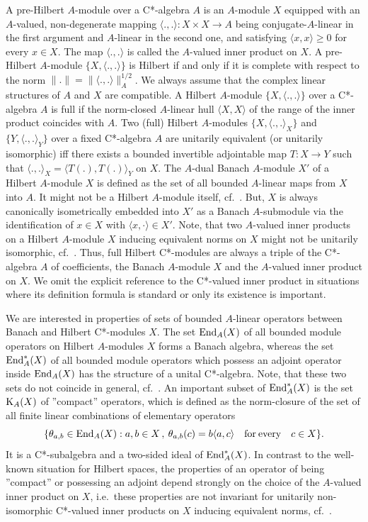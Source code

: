 \documentclass{amsart}
\theoremstyle{definition}
\begin{document}
A pre-Hilbert $A$-module over a C*-algebra $A$ is an $A$-module $X$ equipped with an $A$-valued, non-degenerate mapping $ \langle .,.
\rangle : X \times X \to A$ being conjugate-$A$-linear in the first argument and $A$-linear in the second one, and satisfying $\langle x,x \rangle \geq 0$ for every $x \in X$. The map $\langle .,. \rangle$ is called the $A$-valued inner product on $X$. A pre-Hilbert $A$-module $\{ X, \langle .,. \rangle \}$ is Hilbert if and only if it is complete with respect to the norm $\| . \| = \| \langle .,. \rangle \|^{1/2}_A$. We always assume that the complex linear structures of
$A$ and $X$ are compatible. A Hilbert $A$-module $\{ X, \langle .,. \rangle \}$ over a C*-algebra $A$ is full if the norm-closed $A$-linear hull $\langle X,X \rangle$ of the range of the inner product coincides with $A$. Two (full) Hilbert $A$-modules $\{ X , \langle .,. \rangle_X \}$ and $\{ Y, \langle .,. \rangle_Y \}$ over a fixed C*-algebra $A$ are unitarily equivalent (or unitarily isomorphic) iff there exists a bounded invertible adjointable map $T: X \to Y$ such that $\langle .,. \rangle_X = \langle T(.),T(.) \rangle_Y$ on $X$. The $A$-dual Banach $A$-module $X'$ of a Hilbert $A$-module $X$ is defined as the set of all bounded $A$-linear maps from $X$ into $A$. It might not be a Hilbert $A$-module itself, cf.~\cite{F_1999_1}. But, $X$ is always canonically isometrically embedded into $X'$ as a Banach $A$-submodule via the identification of $x \in X$ with $\langle x, \cdot \rangle \in X'$. 
Note, that two $A$-valued inner products on a Hilbert $A$-module $X$ inducing equivalent norms on $X$ might not be unitarily isomorphic, cf.~\cite{Brown,F_1999_1}. Thus, full Hilbert C*-modules are always a triple of the C*-algebra $A$ of coefficients, the Banach $A$-module $X$ and the $A$-valued inner product on $X$. We omit the explicit reference to the C*-valued inner product in situations where its definition formula is standard or only its existence is important. 

We are interested in properties of sets of bounded $A$-linear operators between Banach and Hilbert C*-modules $X$. The set ${\rm End}_A(X)$ of all bounded module operators on Hilbert $A$-modules $X$ forms a Banach algebra, whereas the set ${\rm End}_A^*(X)$ of all bounded module operators which possess an adjoint operator inside ${\rm End}_A(X)$ has the structure of a unital C*-algebra. Note, that these two sets do not coincide in general, cf.~\cite{Paschke,F_1999_1}. An important subset of ${\rm End}_A^*(X)$ is the set ${\rm K}_A(X)$ of ''compact'' operators, which is defined as the norm-closure of the set of all finite linear combinations of elementary operators
\[
  \{ \theta_{a,b} \in {\rm End}_A(X) : a,b \in X \, , \:
  \theta_{a,b}(c) = b \langle a,c \rangle \quad {\rm for} \: {\rm every}
  \quad c \in X \}.
\]
It is a C*-subalgebra and a two-sided ideal of ${\rm End}_A^*(X)$. In contrast to the well-known situation for Hilbert spaces, the properties
of an operator of being ''compact'' or possessing an adjoint depend strongly on the choice of the $A$-valued inner product on $X$, i.e.~these
properties are not invariant for unitarily non-isomorphic C*-valued inner products on $X$ inducing equivalent norms, cf.~\cite{F_1999_1}.
\end{document}
